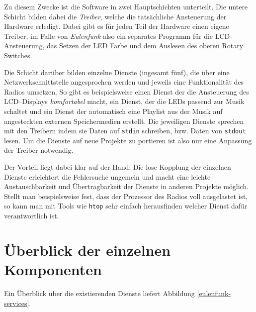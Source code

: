 \documentclass[11pt,ngerman,toc=listof,index=totoc]{scrreprt}
\begin{document}
Zu diesem Zwecke ist die Software in zwei Hauptschichten unterteilt. Die
untere Schicht bilden dabei die \emph{Treiber}, welche die tatsächliche
Ansteuerung der Hardware erledigt. Dabei gibt es für jeden Teil der
Hardware einen eigene Treiber, im Falle von \emph{Eulenfunk} also ein
separates Programm für die LCD-Ansteuerung, das Setzen der LED Farbe und
dem Auslesen des oberen Rotary Switches.

Die Schicht darüber bilden einzelne Dienste (ingesamt fünf), die über
eine Netzwerkschnittstelle angesprochen werden und jeweils eine
Funktionalität des Radios umsetzen. So gibt es beispielsweise einen
Dienst der die Ansteuerung des LCD--Displays \emph{komfortabel} macht,
ein Dienst, der die LEDs passend zur Musik schaltet und ein Dienst der
automatisch eine Playlist aus der Musik auf angesteckten externen
Speichermedien erstellt. Die jeweiligen Dienste sprechen mit den
Treibern indem sie Daten auf \texttt{stdin} schreiben, bzw. Daten von
\texttt{stdout} lesen. Um die Dienste auf neue Projekte zu portieren ist
also nur eine Anpassung der Treiber notwendig.

Der Vorteil liegt dabei klar auf der Hand: Die lose Kopplung der
einzelnen Dienste erleichtert die Fehlersuche ungemein und macht eine
leichte Austauschbarkeit und Übertragbarkeit der Dienste in anderen
Projekte möglich. Stellt man beispielsweise fest, dass der Prozessor des
Radios voll ausgelastet ist, so kann man mit Tools wie \texttt{htop}
sehr einfach herausfinden welcher Dienst dafür verantwortlich ist.

\section{Überblick der einzelnen
Komponenten}\label{uxfcberblick-der-einzelnen-komponenten}

Ein Überblick über die existierenden Dienste liefert Abbildung
\ref{eulenfunk-services}.
\end{document}
